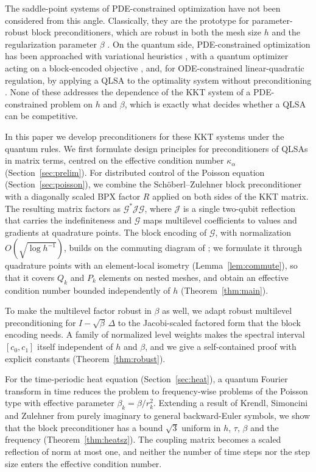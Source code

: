 \documentclass[11pt,a4paper]{article}
\newcommand{\G}{\mathcal{G}}
\newcommand{\J}{\mathcal{J}}
\theoremstyle{remark}
\begin{document}
The saddle-point systems of PDE-constrained optimization have not been
considered from this angle. Classically, they are the prototype for
parameter-robust block preconditioners, which are robust in both the mesh
size $h$ and the regularization parameter $\beta$ \cite{RDW10,SZ07,PW12}. On
the quantum side, PDE-constrained optimization has been approached with
variational heuristics \cite{SG24}, with a quantum optimizer acting on a
block-encoded objective \cite{Sato25}, and, for ODE-constrained
linear-quadratic regulation, by applying a QLSA to the optimality system
without preconditioning \cite{Huang26}. None of these addresses the
dependence of the KKT system of a PDE-constrained problem on $h$ and $\beta$,
which is exactly what decides whether a QLSA can be competitive.

In this paper we develop preconditioners for these KKT systems under the
quantum rules. We first formulate design principles for preconditioners of
QLSAs in matrix terms, centred on the effective condition number $\kappa_\alpha$
(Section~\ref{sec:prelim}). For distributed control of the Poisson equation
(Section~\ref{sec:poisson}), we combine the Sch\"oberl--Zulehner block
preconditioner with a diagonally scaled BPX factor $R$ applied on both sides
of the KKT matrix. The resulting matrix factors as $\G^*\J\G$, where $\J$ is a
single two-qubit reflection that carries the indefiniteness and $\G$ maps
multilevel coefficients to values and gradients at quadrature points. The
block encoding of $\G$, with normalization $O(\sqrt{\log h^{-1}})$, builds on the
commuting diagram of \cite{DP26,YYZ26}; we formulate it through quadrature
points with an element-local isometry (Lemma~\ref{lem:commute}), so that it
covers $Q_k$ and $P_k$ elements on nested meshes, and obtain an effective
condition number bounded independently of $h$ (Theorem~\ref{thm:main}).

To make the multilevel factor robust in $\beta$ as well, we adapt robust
multilevel preconditioning for $I-\sqrt\beta\,\Delta$ \cite{GO95,BPV00} to the
Jacobi-scaled factored form that the block encoding needs. A family of
normalized level weights makes the spectral interval $[c_0,c_1]$ itself
independent of $h$ and $\beta$, and we give a self-contained proof with
explicit constants (Theorem~\ref{thm:robust}).

For the time-periodic heat equation (Section~\ref{sec:heat}), a quantum
Fourier transform in time reduces the problem to frequency-wise problems of
the Poisson type with effective parameter $\beta_k=\beta/r_k^2$. Extending a
result of Krendl, Simoncini and Zulehner \cite{KSZ13} from purely imaginary
to general backward-Euler symbols, we show that the block preconditioner
has a bound $\sqrt3$ uniform in $h$, $\tau$, $\beta$ and the frequency
(Theorem~\ref{thm:heatsz}). The coupling matrix becomes a scaled reflection
of norm at most one, and neither the number of time steps nor the step size
enters the effective condition number.
\end{document}
